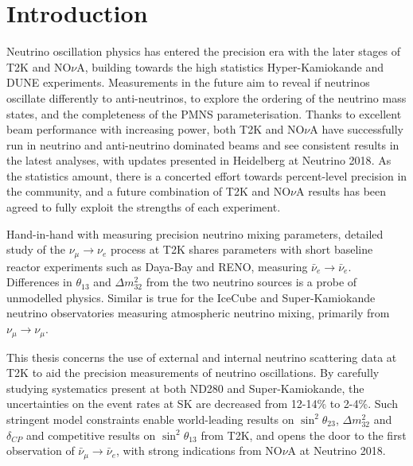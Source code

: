 \chapter{Introduction}
\label{chap:intro}
Neutrino oscillation physics has entered the precision era with the later stages of T2K\cite{t2k_2017} and NO$\nu$A\cite{nova_2018}, building towards the high statistics Hyper-Kamiokande\cite{hyperk} and DUNE\cite{dune} experiments. Measurements in the future aim to reveal if neutrinos oscillate differently to anti-neutrinos, to explore the ordering of the neutrino mass states, and the completeness of the PMNS parameterisation\cite{p1,p2,mns}. Thanks to excellent beam performance with increasing power, both T2K and NO$\nu$A have successfully run in neutrino and anti-neutrino dominated beams and see consistent results in the latest analyses\cite{t2k_2017, nova_2018}, with updates presented in Heidelberg at Neutrino 2018\cite{t2k_neutrino2018, nova_neutrino2018}. As the statistics amount, there is a concerted effort towards percent-level precision in the community, and a future combination of T2K and NO$\nu$A results has been agreed\cite{t2k_nova, t2k_nova_meet} to fully exploit the strengths of each experiment.

Hand-in-hand with measuring precision neutrino mixing parameters, detailed study of the $\nu_\mu \rightarrow \nu_e$ process at T2K shares parameters with short baseline reactor experiments such as Daya-Bay\cite{daya_bay} and RENO\cite{reno}, measuring $\bar{\nu}_e\rightarrow \bar{\nu}_e$. Differences in $\theta_{13}$ and $\Delta m^2_{32}$ from the two neutrino sources is a probe of unmodelled physics. Similar is true for the IceCube\cite{icecube} and Super-Kamiokande\cite{superk} neutrino observatories measuring atmospheric neutrino mixing, primarily from $\nu_\mu \rightarrow \nu_\mu$.

This thesis concerns the use of external and internal neutrino scattering data at T2K to aid the precision measurements of neutrino oscillations. By carefully studying systematics present at both ND280 and Super-Kamiokande, the uncertainties on the event rates at SK are decreased from 12-14\% to 2-4\%. Such stringent model constraints enable world-leading results on $\sin^2\theta_{23}$, $\Delta m^2_{32}$ and $\delta_{CP}$ and competitive results on $\sin^2\theta_{13}$ from T2K\cite{pdg_2017}, and opens the door to the first observation of $\bar{\nu}_\mu \rightarrow \bar{\nu}_e$, with strong indications from NO$\nu$A at Neutrino 2018\cite{nova_neutrino2018}.

